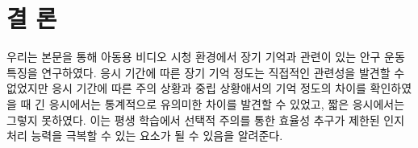 \documentclass{kcc}
\begin{document}
\section{결 론}
우리는 본문을 통해 아동용 비디오 시청 환경에서 장기 기억과 관련이 있는 안구 운동 특징을 연구하였다. 응시 기간에 따른 장기 기억 정도는 직접적인 관련성을 발견할 수 없었지만 응시 기간에 따른 주의 상황과 중립 상황애서의 기억 정도의 차이를 확인하였을 때 긴 응시에서는 통계적으로 유의미한 차이를 발견할 수 있었고, 짧은 응시에서는 그렇지 못하였다. 이는 평생 학습에서 선택적 주의를 통한 효율성 추구가 제한된 인지 처리 능력을 극복할 수 있는 요소가 될 수 있음을 알려준다.




\end{document}
